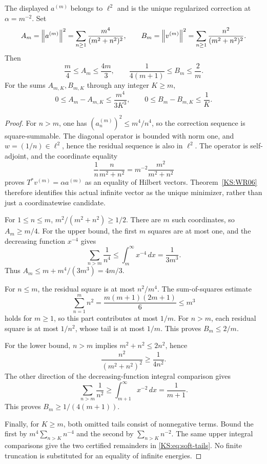 \begin{KSproposition}\label{KS:WR10}
The displayed $a^{(m)}$ belongs to $\ell^2$ and is the unique regularized correction at $\alpha=m^{-2}$. Set
\[
 A_m=\left\lVert a^{(m)}\right\rVert^2=\sum_{n\ge1}\frac{m^4}{(m^2+n^2)^2},\qquad
 B_m=\left\lVert v^{(m)}\right\rVert^2=\sum_{n\ge1}\frac{n^2}{(m^2+n^2)^2}.
\]
Then
\begin{equation}\label{KS:eq:soft-bounds}
 \frac m4\le A_m\le\frac{4m}{3},\qquad
 \frac1{4(m+1)}\le B_m\le\frac2m.
\end{equation}
For the sums $A_{m,K},B_{m,K}$ through any integer $K\ge m$,
\begin{equation}\label{KS:eq:soft-tails}
 0\le A_m-A_{m,K}\le\frac{m^4}{3K^3},\qquad
 0\le B_m-B_{m,K}\le\frac1K.
\end{equation}
\end{KSproposition}
\begin{proof}
For $n>m$, one has $(a_n^{(m)})^2\le m^4/n^4$, so the correction sequence is square-summable. The diagonal operator is bounded with norm one, and $w=(1/n)\in\ell^2$, hence the residual sequence is also in $\ell^2$. The operator is self-adjoint, and the coordinate equality
\[
 \frac1n\frac{n}{m^2+n^2}
 =m^{-2}\frac{m^2}{m^2+n^2}
\]
proves $T^*v^{(m)}=\alpha a^{(m)}$ as an equality of Hilbert vectors. Theorem~\ref{KS:WR06} therefore identifies this actual infinite vector as the unique minimizer, rather than just a coordinatewise candidate.

For $1\le n\le m$, $m^2/(m^2+n^2)\ge1/2$. There are $m$ such coordinates, so $A_m\ge m/4$. For the upper bound, the first $m$ squares are at most one, and the decreasing function $x^{-4}$ gives
\[
 \sum_{n>m}\frac1{n^4}\le\int_m^\infty x^{-4}\,dx=\frac1{3m^3}.
\]
Thus $A_m\le m+m^4/(3m^3)=4m/3$.

For $n\le m$, the residual square is at most $n^2/m^4$. The sum-of-squares estimate
\[
 \sum_{n=1}^m n^2=\frac{m(m+1)(2m+1)}6\le m^3
\]
holds for $m\ge1$, so this part contributes at most $1/m$. For $n>m$, each residual square is at most $1/n^2$, whose tail is at most $1/m$. This proves $B_m\le2/m$.

For the lower bound, $n>m$ implies $m^2+n^2\le2n^2$, hence
\[
 \frac{n^2}{(m^2+n^2)^2}\ge\frac1{4n^2}.
\]
The other direction of the decreasing-function integral comparison gives
\[
 \sum_{n>m}\frac1{n^2}\ge\int_{m+1}^\infty x^{-2}\,dx=\frac1{m+1}.
\]
This proves $B_m\ge1/(4(m+1))$.

Finally, for $K\ge m$, both omitted tails consist of nonnegative terms. Bound the first by $m^4\sum_{n>K}n^{-4}$ and the second by $\sum_{n>K}n^{-2}$. The same upper integral comparisons give the two certified remainders in \eqref{KS:eq:soft-tails}. No finite truncation is substituted for an equality of infinite energies.
\end{proof}

